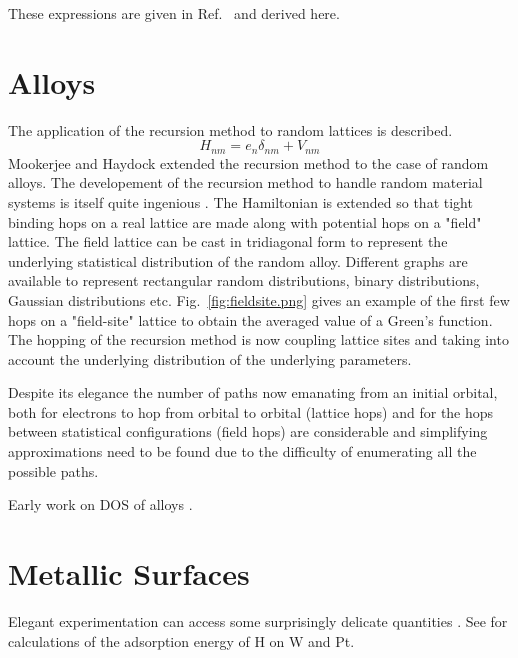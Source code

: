 These expressions are given in Ref.~\cite{sutton95} and derived here.


\section{Alloys}
The application of the recursion method to random lattices is described.
\cite{glaser81}
%
\begin{equation}
H_{nm} = e_{n}\delta_{nm} + V_{nm}
\end{equation}
%
Mookerjee and Haydock extended the recursion method to the case of random alloys.
The developement of the recursion method to handle random material systems is 
itself quite ingenious \cite{mookerjee, haydock74}. The Hamiltonian is extended
so that tight binding hops on a real lattice are made along with potential hops
on a "field" lattice. The field lattice can be cast in tridiagonal form to represent
the underlying statistical distribution of the random alloy. Different graphs are available
to represent rectangular random distributions, binary distributions, Gaussian distributions
etc. Fig.~\ref{fig:fieldsite.png} gives an example of the first few hops on a "field-site" 
lattice to obtain the averaged value of a Green's function. The hopping of the recursion method
is now coupling lattice sites and taking into account the underlying distribution of 
the underlying parameters.

Despite its elegance the number of paths now emanating from an initial orbital, both
for electrons to hop from orbital to orbital (lattice hops) and for the hops between 
statistical configurations (field hops) are considerable and simplifying approximations 
need to be found due to the difficulty of enumerating all the possible paths.

Early work on DOS of alloys \cite{cubiotti77}. 

\section{Metallic Surfaces}
Elegant experimentation can access some surprisingly delicate quantities \cite{whipp34}.
See \cite{bullet77} for calculations of the adsorption energy of H on W and Pt.

